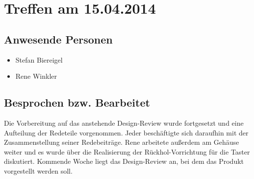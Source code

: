 \chapter{Treffen am 15.04.2014}
\section{Anwesende Personen}
\begin{itemize}
	\item Stefan Biereigel
	\item Rene Winkler
\end{itemize}

\section{Besprochen bzw. Bearbeitet}
Die Vorbereitung auf das anstehende Design-Review wurde fortgesetzt und eine Aufteilung der Redeteile vorgenommen. Jeder beschäftigte sich daraufhin mit der Zusammenstellung seiner Redebeiträge. Rene arbeitete außerdem am Gehäuse weiter und es wurde über die Realisierung der Rückhol-Vorrichtung für die Taster diskutiert. Kommende Woche liegt das Design-Review an, bei dem das Produkt vorgestellt werden soll.
